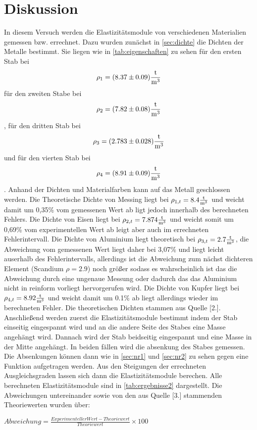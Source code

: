 \section{Diskussion}
\label{sec:diskussion}
In diesem Versuch werden die Elastizitätsmodule von verschiedenen Materialien gemessen bzw. errechnet.
Dazu wurden zunächst in \autoref{sec:dichte} die Dichten der Metalle bestimmt. Sie liegen wie in
\autoref{tab:eigenschaften} zu sehen für den ersten Stab bei $$\rho_1=(8.37\pm 0.09)\si[]{\frac{t}{m^3}}$$ für den zweiten Stabe 
bei $$\rho_2=(7.82\pm 0.08)\si[]{\frac{t}{m^3}}$$, für den dritten Stab bei $$\rho_3=(2.783\pm 0.028)\si[]{\frac{t}{m^3}}$$ und für den vierten Stab bei
$$\rho_4=(8.91\pm0.09)\si[]{\frac{t}{m^3}}$$. Anhand der Dichten und Materialfarben kann auf das Metall geschlossen werden. Die Theoretische 
Dichte von Messing liegt bei $\rho_{1,t}=8.4\si[]{\frac{t}{m^3}}$ und weicht damit um 0,35\% vom gemessenen Wert ab ligt jedoch innerhalb des berechneten
Fehlers. Die Dichte von Eisen liegt bei  $\rho_{2,t}=7.874\si[]{\frac{t}{m^3}}$ und weicht somit um 0,69\% vom experimentellen Wert ab leigt aber auch im 
errechneten Fehlerintervall. Die Dichte von Aluminium liegt theoretisch bei $\rho_{3,t}=2.7\si[]{\frac{t}{m^3}}$, die Abweichung vom gemessenen Wert liegt daher 
bei 3,07\% und liegt leicht auserhalb des Fehlerintervalls, allerdings ist die Abweichung zum nächst dichteren Element (Scandium $\rho=2.9$) noch größer
sodass es wahrscheinlich ist das die Abweichung durch eine ungenaue Messung oder dadurch das das Aluminium nicht in reinform vorliegt hervorgerufen wird.
Die Dichte von Kupfer liegt bei $\rho_{4,t}=8.92\si[]{\frac{t}{m^3}}$ und weicht damit um 0.1\% ab liegt allerdings wieder im berechneten Fehler.
Die theoretischen Dichten stammen aus Quelle [2.]. Anschließend werden zuerst die Elastizitätsmodule bestimmt indem der Stab einseitig eingespannt 
wird und an die andere Seite des Stabes eine Masse angehängt wird. Dannach wird der Stab beidseitig eingespannt und eine Masse in der Mitte angehängt.
In beiden fällen wird die absenkung des Stabes gemessen. Die Absenkungen können dann wie in \autoref{sec:nr1} und \autoref{sec:nr2} zu sehen gegen eine
Funktion aufgetragen werden. Aus den Steigungen der errechneten Ausgleichsgraden lassen sich dann die Elastizitätsmodule berechen. Alle berechneten 
Elastizitätsmodule sind in \autoref{tab:ergebnisse2} dargestellt. Die Abweichungen untereinander sowie von den aus Quelle [3.] stammenden Theoriewerten 
wurden über:
\begin{center}
    $Abweichung=\frac{Experimenteller Wert - Theoriewert}{Theoriewert}\times 100$
\end{center}
